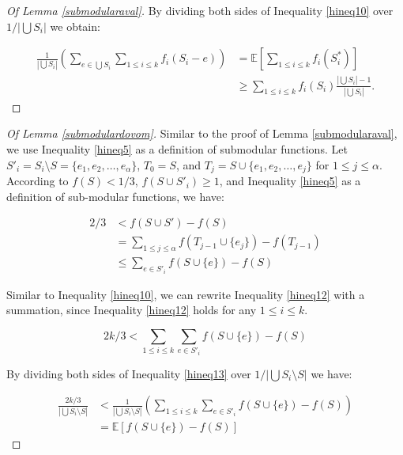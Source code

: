 \begin{proof}[Of Lemma \ref{submodularaval}]
By dividing both sides of Inequality \eqref{hineq10} over $1/|\bigcup S_i|$ we obtain:

\begin{equation}
\label{hineq11} 
\begin{split}
    \frac{1}{|\bigcup S_i|}(\sum_{e \in \bigcup S_i} \sum_{1 \leq i \leq k} f_i(S_i - e)) &= \mathbb{E}[\sum_{1 \leq i \leq k} f_i(S^*_i)]\\
    &\geq \sum_{1 \leq i \leq k} f_i(S_i)\frac{|\bigcup S_i| -1}{|\bigcup S_i|}.
\end{split}
\end{equation}

\end{proof}

\begin{proof}[Of Lemma \ref{submodulardovom}]
Similar to the proof of Lemma \ref{submodularaval}, we use Inequality \eqref{hineq5} as a definition of submodular functions. Let $S'_i = S_i \setminus S = \{e_1, e_2, \ldots, e_{\alpha}\}$, $T_0 = S$, and $T_j = S \cup \{e_1, e_2, \ldots, e_j\}$ for $1 \leq j \leq \alpha$. According to $f(S) < 1/3$, $f(S \cup S'_i) \geq 1$, and Inequality \eqref{hineq5} as a definition of sub-modular functions, we have:

\begin{equation}
\label{hineq12} 
\begin{split}
    2/3 &< f(S \cup S') - f(S)\\
    &= \sum_{1 \leq j \leq \alpha} f(T_{j-1} \cup \{e_j\}) - f(T_{j-1})\\
    &\leq \sum_{e \in S'_i} f(S \cup \{e\}) - f(S)
\end{split}
\end{equation}

Similar to Inequality \eqref{hineq10}, we can rewrite Inequality \eqref{hineq12} with a summation, since Inequality \eqref{hineq12} holds for any $1 \leq i \leq k$.

\begin{equation}
    \label{hineq13}
    2k/3 < \sum_{1 \leq i \leq k} \sum_{e \in S'_i} f(S \cup \{e\}) - f(S)
\end{equation}

By dividing both sides of Inequality \eqref{hineq13} over $1/ |\bigcup S_i \setminus S|$ we have:

\begin{equation}
    \label{hineq14}
    \begin{split}
    \frac{2k/3}{|\bigcup S_i \setminus S|} &< \frac{1}{|\bigcup S_i \setminus S|}(\sum_{1 \leq i \leq k} \sum_{e \in S'_i} f(S \cup \{e\}) - f(S))\\
    &= \mathbb{E}[f(S \cup \{e\}) - f(S)]
    \end{split}
\end{equation}
\end{proof}